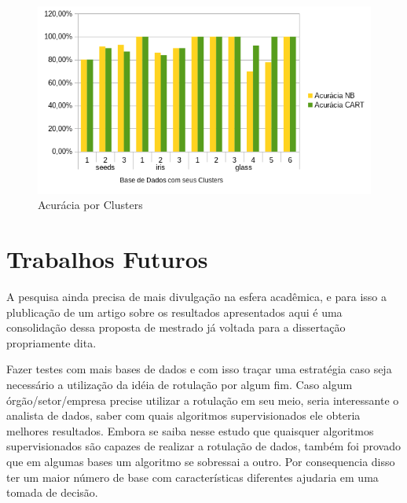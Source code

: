 \begin{figure}[h!]
    \centering
        
  \includegraphics[scale=0.9]{figs/grafico_NB_CART_acuracia.png}
  \caption{Acurácia por Clusters} \label{fig:graf:grafico_NB_CART_acuracia}
\end{figure}





\section{Trabalhos Futuros}\label{cap:fut}

A pesquisa ainda precisa de mais divulgação na esfera acadêmica, e para isso a plublicação de um artigo sobre os resultados apresentados aqui é uma consolidação dessa proposta de mestrado já voltada para a dissertação propriamente dita.

Fazer testes com mais bases de dados  e com isso traçar uma estratégia caso seja necessário a utilização da idéia de rotulação por algum fim. Caso algum órgão/setor/empresa precise utilizar a rotulação em seu meio, seria interessante o analista de dados,  saber com quais algoritmos supervisionados ele obteria melhores resultados. Embora se saiba nesse estudo que quaisquer algoritmos supervisionados são capazes de realizar a rotulação de dados, também foi provado que em algumas bases um algoritmo se sobressai a outro. Por consequencia disso ter um maior número de base com características diferentes ajudaria em uma tomada de decisão.

